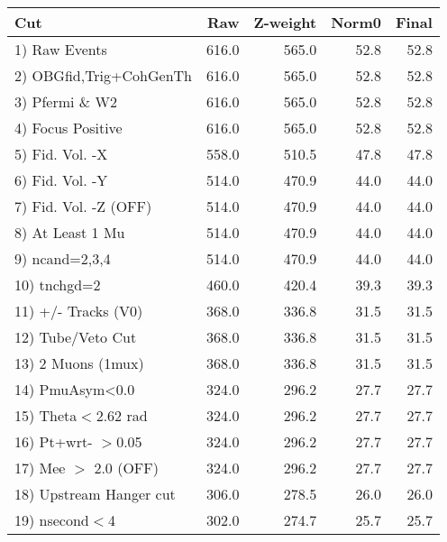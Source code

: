  \begin{table}[h!]\centering
 \begin{tabular}{||l||r|r|r|r||}
 \hline
 \hline
 Cut & Raw & Z-weight & Norm0 & Final \\
 \hline
  1) Raw Events           &       616.0 &       565.0 &        52.8 &        52.8 \\
  2) OBGfid,Trig+CohGenTh &       616.0 &       565.0 &        52.8 &        52.8 \\
  3) Pfermi \& W2         &       616.0 &       565.0 &        52.8 &        52.8 \\
  4) Focus Positive       &       616.0 &       565.0 &        52.8 &        52.8 \\
  5) Fid. Vol. -X         &       558.0 &       510.5 &        47.8 &        47.8 \\
  6) Fid. Vol. -Y         &       514.0 &       470.9 &        44.0 &        44.0 \\
  7) Fid. Vol. -Z (OFF)   &       514.0 &       470.9 &        44.0 &        44.0 \\
  8) At Least 1 Mu        &       514.0 &       470.9 &        44.0 &        44.0 \\
  9) ncand=2,3,4          &       514.0 &       470.9 &        44.0 &        44.0 \\
 10) tnchgd=2             &       460.0 &       420.4 &        39.3 &        39.3 \\
 11) +/- Tracks (V0)      &       368.0 &       336.8 &        31.5 &        31.5 \\
 12) Tube/Veto Cut        &       368.0 &       336.8 &        31.5 &        31.5 \\
 13) 2 Muons (1mux)       &       368.0 &       336.8 &        31.5 &        31.5 \\
 14) PmuAsym<0.0          &       324.0 &       296.2 &        27.7 &        27.7 \\
 15) Theta$<$2.62 rad     &       324.0 &       296.2 &        27.7 &        27.7 \\
 16) Pt+wrt- $>$0.05      &       324.0 &       296.2 &        27.7 &        27.7 \\
 17) Mee $>$ 2.0  (OFF)   &       324.0 &       296.2 &        27.7 &        27.7 \\
 18) Upstream Hanger cut  &       306.0 &       278.5 &        26.0 &        26.0 \\
 19) nsecond$<$4          &       302.0 &       274.7 &        25.7 &        25.7 \\

\end{tabular}
\end{table}

